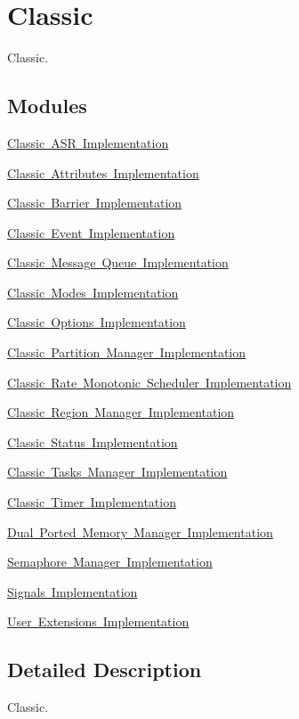 \hypertarget{group__RTEMSInternalClassic}{}\section{Classic}
\label{group__RTEMSInternalClassic}


Classic.  


\subsection*{Modules}
\begin{DoxyCompactItemize}
\item 
\mbox{\hyperlink{group__ClassicASRImpl}{Classic A\+S\+R Implementation}}
\item 
\mbox{\hyperlink{group__ClassicAttributesImpl}{Classic Attributes Implementation}}
\item 
\mbox{\hyperlink{group__ClassicBarrierImpl}{Classic Barrier Implementation}}
\item 
\mbox{\hyperlink{group__ClassicEventImpl}{Classic Event Implementation}}
\item 
\mbox{\hyperlink{group__ClassicMessageQueueImpl}{Classic Message Queue Implementation}}
\item 
\mbox{\hyperlink{group__ClassicModesImpl}{Classic Modes Implementation}}
\item 
\mbox{\hyperlink{group__ClassicOptionsImpl}{Classic Options Implementation}}
\item 
\mbox{\hyperlink{group__ClassicPartImpl}{Classic Partition Manager Implementation}}
\item 
\mbox{\hyperlink{group__ClassicRateMonImpl}{Classic Rate Monotonic Scheduler Implementation}}
\item 
\mbox{\hyperlink{group__ClassicRegionImpl}{Classic Region Manager Implementation}}
\item 
\mbox{\hyperlink{group__ClassicStatusImpl}{Classic Status Implementation}}
\item 
\mbox{\hyperlink{group__ClassicTasksImpl}{Classic Tasks Manager Implementation}}
\item 
\mbox{\hyperlink{group__ClassicTimerImpl}{Classic Timer Implementation}}
\item 
\mbox{\hyperlink{group__ClassicDPMEMImpl}{Dual Ported Memory Manager Implementation}}
\item 
\mbox{\hyperlink{group__ClassicSemImpl}{Semaphore Manager Implementation}}
\item 
\mbox{\hyperlink{group__ClassicSignalImpl}{Signals Implementation}}
\item 
\mbox{\hyperlink{group__ClassicUserExtensionsImpl}{User Extensions Implementation}}
\end{DoxyCompactItemize}


\subsection{Detailed Description}
Classic. 

